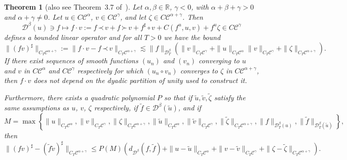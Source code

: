 \documentclass[a4paper,11pt]{article}
\newcommand{\assign}{:=}
\newcommand{\cdummy}{\cdot}
\newtheorem{theorem}{Theorem}
\newcommand{\CC}{\mathscr{C}}
\newcommand{\CD}{\mathscr{D}}
\newcommand{\DD}{\mathscr{D}}
\newcommand{\lpara}{\,\mathord{\prec}\,}
\newcommand{\rpara}{\,\mathord{\succ}\,}
\newcommand{\reso}{\,\mathord{\circ}\,}
\begin{document}
\begin{theorem}[also see Theorem~3.7 of~\cite{Gubinelli2012}]\label{thm:paracontrolled product}
   Let $\alpha, \beta \in \mathbb{R}$,
  $\gamma < 0$, with $\alpha + \beta + \gamma > 0$ and $\alpha + \gamma \neq
  0$. Let $u \in C \CC^{\alpha}$, $v \in C \CC^{\gamma}$, and let $\zeta \in C
  \CC^{\alpha + \gamma}$. Then
  \[ \DD^{\beta} (u) \ni f \mapsto f \cdummy v \assign f \lpara v + f \rpara v +
     f^{\sharp} \reso v + C (f^u, u, v) + f^u \zeta \in C \CC^{\gamma} \]
  defines a bounded linear operator and for all $T > 0$ we have the bound
  \[ \| (f v)^{\sharp} \|_{C_T \CC^{\alpha + \gamma}} \assign \| f \cdummy v -
     f \lpara v \|_{C_T \CC^{\alpha + \gamma}} \lesssim \| f \|_{\CD^{\beta}_T}
     \left( \| v \|_{C_T \CC^{\gamma}} + \| u \|_{C_T \CC^{\alpha}} \| v
     \|_{C_T \CC^{\gamma}} + \| \zeta \|_{C_T \CC^{\alpha + \gamma}} \right) .
  \]
  If there exist sequences of smooth functions $(u_n)$ and $(v_n)$ converging
  to $u$ and $v$ in $C \CC^{\alpha}$ and  $C \CC^{\gamma}$ respectively for which $(u_n \reso v_n)$ converges to $\zeta$ in $C \CC^{\alpha+\gamma}$,
  then $f \cdummy v$ does not depend on the dyadic partition of unity used to
  construct it.
  
  Furthermore, there exists a quadratic polynomial $P$ so that if $\tilde{u},
  \tilde{v}, \tilde{\zeta}$ satisfy the same assumptions as $u$, $v$, $\zeta$
  respectively, if $\tilde{f} \in \CD^{\beta} (\tilde{u})$, and if
  \[ M = \max \left\{ \| u \|_{C_T \CC^{\alpha}}, \| v \|_{C_T \CC^{\gamma}},
     \| \zeta \|_{C_T \CC^{\alpha + \gamma}}, \| \tilde{u} \|_{C_T
     \CC^{\alpha}}, \| \tilde{v} \|_{C_T \CC^{\gamma}}, \| \tilde{\zeta}
     \|_{C_T \CC^{\alpha + \gamma}}, \|f\|_{\DD^{\beta}_T (u)}, \| \tilde{f}
     \|_{\DD^{\beta}_T (\tilde{u})} \right\}, \]
  then
  \[ \| (f v)^{\sharp} - (\tilde{f} \tilde{v})^{\sharp} \|_{C_T\CC^{\alpha + \gamma}}
     \leqslant P (M) \left( d_{\DD^{\beta}} (f, \tilde{f}) +\|u - \tilde{u}
     \|_{C_T\CC^\alpha} +\|v - \tilde{v} \|_{C_T\CC^\gamma} +\| \zeta - \tilde{\zeta}
     \|_{C_T\CC^{\alpha + \gamma}} \right) . \]
\end{theorem}
\end{document}
